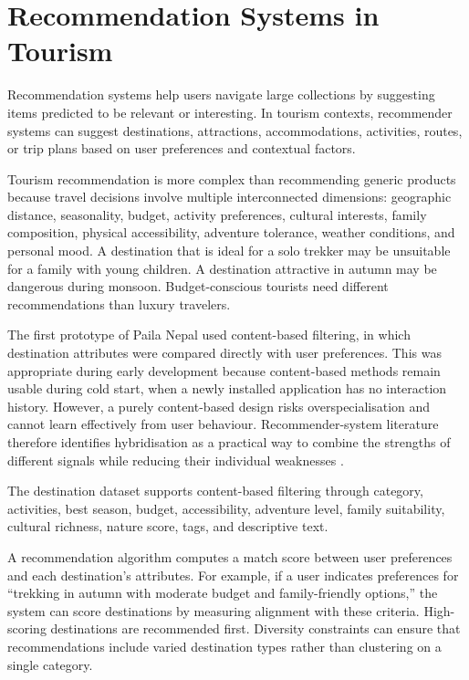 \documentclass[12pt,a4paper,oneside]{report}
\begin{document}
\section{Recommendation Systems in Tourism}
\label{sec:recommendation_systems}

Recommendation systems help users navigate large collections by suggesting items predicted to be relevant or interesting. In tourism contexts, recommender systems can suggest destinations, attractions, accommodations, activities, routes, or trip plans based on user preferences and contextual factors.

Tourism recommendation is more complex than recommending generic products because travel decisions involve multiple interconnected dimensions: geographic distance, seasonality, budget, activity preferences, cultural interests, family composition, physical accessibility, adventure tolerance, weather conditions, and personal mood. A destination that is ideal for a solo trekker may be unsuitable for a family with young children. A destination attractive in autumn may be dangerous during monsoon. Budget-conscious tourists need different recommendations than luxury travelers.

The first prototype of Paila Nepal used content-based filtering, in which destination attributes were compared directly with user preferences. This was appropriate during early development because content-based methods remain usable during cold start, when a newly installed application has no interaction history. However, a purely content-based design risks overspecialisation and cannot learn effectively from user behaviour. Recommender-system literature therefore identifies hybridisation as a practical way to combine the strengths of different signals while reducing their individual weaknesses \parencite{Adomavicius2005,Burke2002}.

The destination dataset supports content-based filtering through category, activities, best season, budget, accessibility, adventure level, family suitability, cultural richness, nature score, tags, and descriptive text.

A recommendation algorithm computes a match score between user preferences and each destination's attributes. For example, if a user indicates preferences for ``trekking in autumn with moderate budget and family-friendly options,'' the system can score destinations by measuring alignment with these criteria. High-scoring destinations are recommended first. Diversity constraints can ensure that recommendations include varied destination types rather than clustering on a single category.
\end{document}
